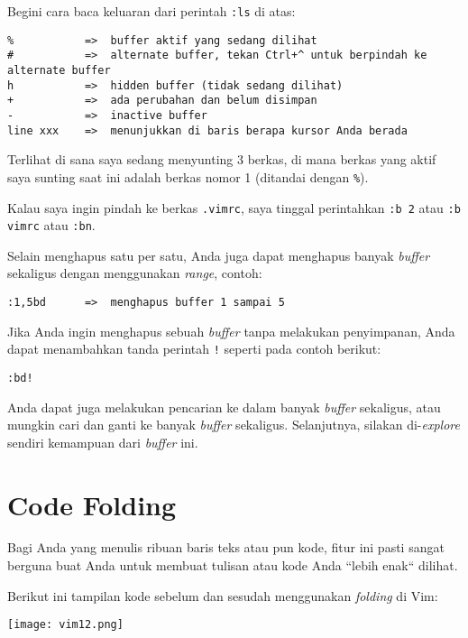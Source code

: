 \documentclass{article}
\begin{document}
Begini cara baca keluaran dari perintah \verb=:ls= di atas:

\begin{verbatim}
%           =>  buffer aktif yang sedang dilihat
#           =>  alternate buffer, tekan Ctrl+^ untuk berpindah ke alternate buffer
h           =>  hidden buffer (tidak sedang dilihat)
+           =>  ada perubahan dan belum disimpan
-           =>  inactive buffer
line xxx    =>  menunjukkan di baris berapa kursor Anda berada
\end{verbatim}

Terlihat di sana saya sedang menyunting 3 berkas, di mana
berkas yang aktif saya sunting saat ini adalah berkas nomor
1 (ditandai dengan \verb=%=).

Kalau saya ingin pindah ke berkas \verb=.vimrc=, saya
tinggal perintahkan \verb=:b 2= atau \verb=:b vimrc= atau
\verb=:bn=.

Selain menghapus satu per satu, Anda juga dapat menghapus
banyak \emph{buffer} sekaligus dengan menggunakan
\emph{range}, contoh:

\begin{verbatim}
:1,5bd      =>  menghapus buffer 1 sampai 5
\end{verbatim}

Jika Anda ingin menghapus sebuah \emph{buffer} tanpa
melakukan penyimpanan, Anda dapat menambahkan tanda perintah
\verb=!= seperti pada contoh berikut:

\begin{verbatim}
:bd!
\end{verbatim}

Anda dapat juga melakukan pencarian ke dalam banyak
\emph{buffer} sekaligus, atau mungkin cari dan ganti ke
banyak \emph{buffer} sekaligus. Selanjutnya, silakan
di-\emph{explore} sendiri kemampuan dari \emph{buffer} ini.

\section{Code Folding}
Bagi Anda yang menulis ribuan baris teks atau pun kode,
fitur ini pasti sangat berguna buat Anda untuk membuat
tulisan atau kode Anda ``lebih enak`` dilihat.

Berikut ini tampilan kode sebelum dan sesudah menggunakan
\emph{folding} di Vim:

\vspace{12pt}

\texttt{[image: vim12.png]}

\vspace{12pt}
\end{document}

